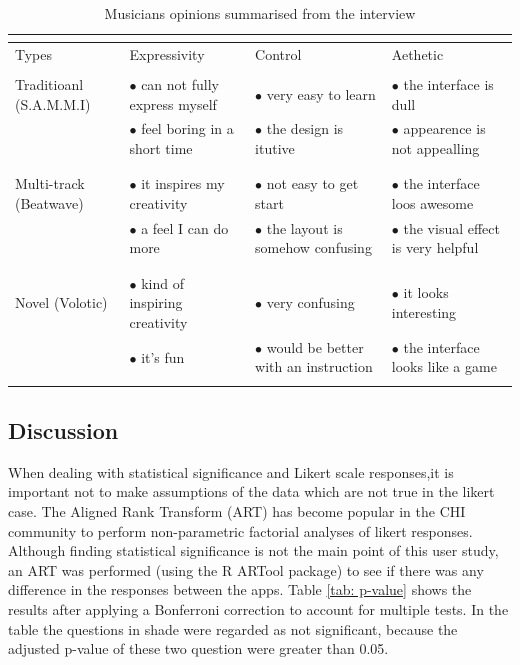 \begin{table}[h]
  \centering
  \begin{tabular}{ |p{2cm}|p{3.2cm}|p{3.2cm}|p{3.2cm}|}
   \multicolumn{4}{c}{} \\
   \hline
   \rowcolor{gray!50}
   Types &  Expressivity  &  Control  &  Aethetic \\[2ex]
   \hline
   & & & \\
   Traditioanl (S.A.M.M.I) & $\bullet$ can not fully express myself & $\bullet$ very easy to learn & $\bullet$ the interface is dull\\
   & $\bullet$ feel boring in a short time &  $\bullet$ the design is itutive & $\bullet$ appearence is not appealling\\
   & & &\\
   \hline
   & & &\\
   Multi-track  (Beatwave)& $\bullet$ it inspires my creativity & $\bullet$ not easy to get start & $\bullet$ the interface loos awesome\\
   & $\bullet$ a feel I can do more& $\bullet$ the layout is somehow confusing & $\bullet$ the visual effect is very helpful\\
   & & &\\
   \hline
   & & &\\
   Novel  (Volotic)& $\bullet$ kind of inspiring creativity & $\bullet$ very confusing & $\bullet$ it looks interesting\\
   & $\bullet$ it's fun & $\bullet$ would be better with an instruction & $\bullet$ the interface looks like a game\\
   & & &\\
   \hline
  \end{tabular}
  \caption{ Musicians opinions summarised from the interview}
  \label{tab: suduko}
\end{table}

\subsection{Discussion}

When dealing with statistical significance and Likert scale responses,it is important not to make assumptions of the data which are not true in the likert case\citep{norman_likert_2010}. The Aligned Rank
Transform\citep{wobbrock_aligned_2011} (ART) has become popular in the CHI community to perform non-parametric factorial analyses of likert responses. Although finding statistical significance is not the main
point of this user study, an ART was performed (using the R ARTool package\citep{matthew_kay_2016_48543}) to see if there was any difference in the responses between the apps. Table \ref{tab: p-value} shows the results after applying a Bonferroni correction to account for multiple tests. In the table the questions in shade were regarded as not significant, because the adjusted p-value of these two question were greater than 0.05.

